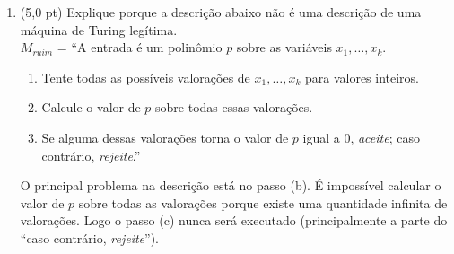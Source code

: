 \documentclass[12pt,a4paper,oneside]{article}
\begin{document}
\begin{enumerate}
	\newpage	
	
	\item (5,0 pt) Explique porque a descrição abaixo não é uma descrição de uma máquina de Turing legítima.\\
	$M_{ruim}$ = ``A entrada é um polinômio $p$ sobre as variáveis $x_1, \ldots, x_k$.
	\begin{enumerate}
		\item Tente todas as possíveis valorações de $x_1, \ldots, x_k$ para valores
inteiros.
		\item Calcule o valor de $p$ sobre todas essas valorações.
		\item Se alguma dessas valorações torna o valor de $p$ igual a 0, {\it aceite}; caso contrário, {\it rejeite}.''
	\end{enumerate}
	{\color{verde}
	O principal problema na descrição está no passo (b). É impossível calcular o valor de $p$ sobre todas as valorações porque existe uma quantidade infinita de valorações. Logo o passo (c) nunca será executado (principalmente a parte do ``caso contrário, {\it rejeite}'').
	}
\end{enumerate}
\end{document}
